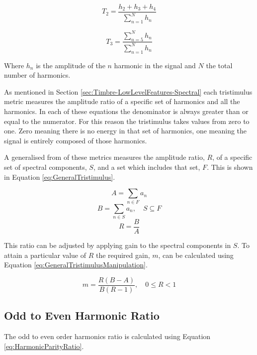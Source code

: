 		\begin{equation}
			T_{2} = \frac{h_{2} + h_{3} + h_{4}}{\sum_{n = 1}^{N} h_{n}}
			\label{eq:Tristimulus2}
		\end{equation}

		\begin{equation}
			T_{3} = \frac{\sum_{n = 5}^{N} h_{n}}{\sum_{n = 1}^{N} h_{n}}
			\label{eq:Tristimulus3}
		\end{equation}

		Where $h_{n}$ is the amplitude of the $n$ harmonic in the signal and $N$ the total number of
		harmonics.

		As mentioned in Section \ref{sec:Timbre-LowLevelFeatures-Spectral} each tristimulus metric measures the
		amplitude ratio of a specific set of harmonics and all the harmonics. In each of these equations the
		denominator is always greater than or equal to the numerator. For this reason the tristimulus takes values
		from zero to one. Zero meaning there is no energy in that set of harmonics, one meaning the signal is
		entirely composed of those harmonics.

		A generalised from of these metrics measures the amplitude ratio, $R$, of a specific set of spectral
		components, $S$, and a set which includes that set, $F$. This is shown in Equation
		\ref{eq:GeneralTristimulus}.

		\[ A = \sum_{n \in F} a_{n} \]
		\[ B = \sum_{n \in S} a_{n}, \quad S \subseteq F \]
		\begin{equation}
			R = \frac{B}{A}
			\label{eq:GeneralTristimulus}
		\end{equation}

		This ratio can be adjusted by applying gain to the spectral components in $S$. To attain a particular value
		of $R$ the required gain, $m$, can be calculated using Equation \ref{eq:GeneralTristimulusManipulation}.

		\begin{equation}
			m = \frac{R(B - A)}{B(R - 1)}, \quad 0 \leq R < 1
			\label{eq:GeneralTristimulusManipulation}
		\end{equation}

	\subsection{Odd to Even Harmonic Ratio}
	\label{sec:FeatureControl-Parameterisation-HarmonicParityRatio}
		The odd to even order harmonics ratio is calculated using Equation \ref{eq:HarmonicParityRatio}.
		
